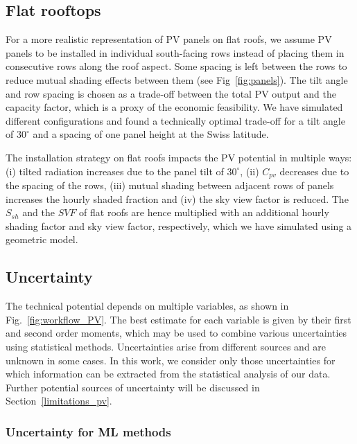 \subsection{Flat rooftops}
\label{flat}

For a more realistic representation of PV panels on flat roofs, we assume PV panels to be installed in individual south-facing rows instead of placing them in consecutive rows along the roof aspect. Some spacing is left between the rows to reduce mutual shading effects between them (see Fig~\ref{fig:panels}).
The tilt angle and row spacing is chosen as a trade-off between the total PV output and the capacity factor, which is a proxy of the economic feasibility.
We have simulated different configurations and found a technically optimal trade-off for a tilt angle of $30^\circ$ and a spacing of one panel height at the Swiss latitude.

The installation strategy on flat roofs impacts the PV potential in multiple ways: (i) tilted radiation increases due to the panel tilt of $30^\circ$, (ii) $C_{pv}$ decreases due to the spacing of the rows, (iii) mutual shading between adjacent rows of panels increases the hourly shaded fraction and (iv) the sky view factor is reduced. The $S_{sh}$ and the $SVF$ of flat roofs are hence multiplied with an additional hourly shading factor and sky view factor, respectively, which we have simulated using a geometric model. %


\subsection{Uncertainty}
\label{unc}

The technical potential depends on multiple variables, as shown in Fig.~\ref{fig:workflow_PV}. 
The best estimate for each variable is given by their first and second order moments, which may be used to combine various uncertainties using statistical methods.
%
Uncertainties arise from different sources and are unknown in some cases. 
In this work, we consider only those uncertainties for which information can be extracted from the statistical analysis of our data. Further potential sources of uncertainty will be discussed in Section~\ref{limitations_pv}.

\subsubsection{Uncertainty for ML methods}

